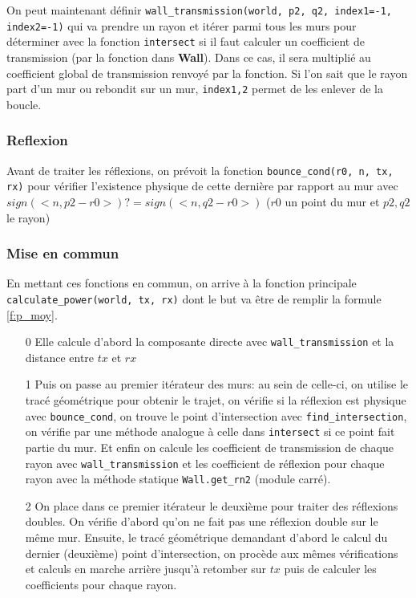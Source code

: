 \documentclass[sn-mathphys-num]{sn-jnl}
\begin{document}
On peut maintenant définir \texttt{wall\_transmission(world, p2, q2, index1=-1, index2=-1)}
qui va prendre un rayon et itérer parmi tous les murs pour déterminer avec la fonction
\texttt{intersect} si il faut calculer un coefficient de transmission (par la fonction dans \textbf{Wall}). Dans
ce cas, il sera multiplié au coefficient global de transmission renvoyé par la fonction.
Si l'on sait que le rayon part d'un mur ou rebondit sur un mur, \texttt{index1,2} permet 
de les enlever de la boucle.

\subsubsection{Reflexion}
Avant de traiter les réflexions, on prévoit la fonction \texttt{bounce\_cond(r0, n, tx, rx)}
pour vérifier l'existence physique de cette dernière par rapport au mur avec
$sign(<n,p2 - r0>) ?= sign(<n,q2 - r0>)$ ($r0$ un point du mur et $p2,q2$ le rayon)


\subsubsection{Mise en commun}
En mettant ces fonctions en commun, on arrive à la fonction 
principale \texttt{calculate\_power(world, tx, rx)} dont
le but va être de remplir la formule \eqref{f:p_moy}.

\begin{enumerate}
    \item[0] Elle calcule d'abord la
composante directe avec \texttt{wall\_transmission} et la distance entre $tx$ et $rx$
    \item[1] Puis on passe au premier itérateur des murs: au sein de celle-ci,
on utilise le tracé géométrique pour obtenir le trajet, on vérifie si la réflexion
est physique avec \texttt{bounce\_cond}, on trouve le point d'intersection avec
\texttt{find\_intersection},
on vérifie par une méthode analogue à celle dans \texttt{intersect} si ce point fait partie du mur.
Et enfin on calcule les coefficient de transmission de chaque rayon avec \texttt{wall\_transmission}
et les coefficient de réflexion pour chaque rayon avec la méthode statique \texttt{Wall.get\_rn2} (module carré).
    \item[2] On place dans ce premier itérateur le deuxième pour traiter des réflexions doubles.
On vérifie d'abord qu'on ne fait pas une réflexion double sur le même mur.
Ensuite, le tracé géométrique demandant d'abord le calcul du dernier (deuxième) point d'intersection,
on procède aux mêmes vérifications et calculs en marche arrière jusqu'à retomber sur $tx$
puis de calculer les coefficients pour chaque rayon.
\end{enumerate}
\end{document}
